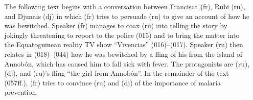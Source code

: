 The following text begins with a conversation between Francisca (fr), Rubi (ru), and Djunais (dj) in which (fr) tries to persuade (ru) to give an account of how he was bewitched. Speaker (fr) manages to coax (ru) into telling the story by jokingly threatening to report to the police (015) and to bring the matter into the Equatoguinean reality TV show “Vivencias” (016)–(017). Speaker (ru) then relates in (018)–(044) how he was bewitched by a fling of his from the island of Annobón, which has caused him to fall sick with fever. The protagonists are (ru), (dj), and (ru)’s fling “the girl from Annobón”. In the remainder of the text (057ff.), (fr) tries to convince (ru) and (dj) of the importance of malaria prevention.

\setcounter{equation}{0}  %

